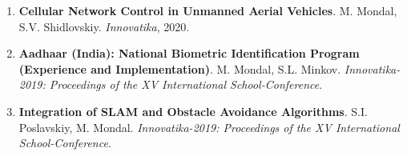 \begin{enumerate}[leftmargin=*,noitemsep,nolistsep]
\item \textbf{Cellular Network Control in Unmanned Aerial Vehicles}.  
M. Mondal, S.V. Shidlovskiy. \textit{Innovatika}, 2020.

\item \textbf{Aadhaar (India): National Biometric Identification Program (Experience and Implementation)}.  
M. Mondal, S.L. Minkov. \textit{Innovatika-2019: Proceedings of the XV International School-Conference}.

\item \textbf{Integration of SLAM and Obstacle Avoidance Algorithms}.  
S.I. Poslavskiy, M. Mondal. \textit{Innovatika-2019: Proceedings of the XV International School-Conference}.

\end{enumerate}
